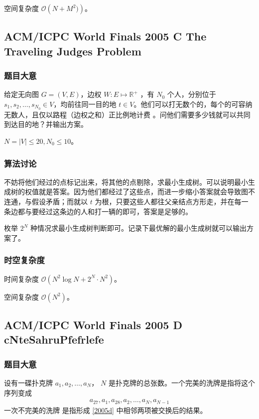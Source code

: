 				空间复杂度 $\mathcal{O}\left(N + M^2)\right)$。
		\newpage
		\subsection{ACM/ICPC World Finals 2005 C The Traveling Judges Problem}
			\subsubsection{题目大意}
				给定无向图 $G=(V, E)$，边权 $W: E \mapsto \mathbb{R}^{+}$ ，有 $N_0$ 个人，分别位于 $s_1, s_2, \ldots, s_{N_0}\in V$，均前往同一目的地 $t \in V$。他们可以打无数个的，每个的可容纳无数人，且仅以路程（边权之和）正比例地计费
				。问他们需要多少钱就可以共同到达目的地？并输出方案。
				
				$N = |V| \le 20, N_0 \le 10
				$。
			\subsubsection{算法讨论}
				不妨将他们经过的点标记出来，将其他的点剔除，求最小生成树。可以说明最小生成树的权值就是答案。因为他们都经过了这些点，而进一步缩小答案就会导致图不连通，与假设矛盾；而就以 $t$ 为根，只要这些人都往父亲结点方形走，并在每一条边都与要经过这条边的人和打一辆的即可，答案是足够的。
				
				枚举 $2^N$ 种情况求最小生成树判断即可。记录下最优解的最小生成树就可以输出方案了。
			\subsubsection{时空复杂度}
				时间复杂度 $\mathcal{O}\left(N^2\log N + 2^N \cdot N^2 \right)$。
					
				空间复杂度 $\mathcal{O}\left(N^2\right)$。
		\newpage
		\subsection{ACM/ICPC World Finals 2005 D cNteSahruPfefrlefe}
			\subsubsection{题目大意}
				设有一碟扑克牌  $a_1, a_2, \ldots, a_N$， $N$ 是扑克牌的总张数。一个完美的洗牌是指将这个序列变成
				\begin{align}
					a_{27},  a_1, a_{28}, a_2, \ldots, a_N, a_{N-1}  \label{2005d}
				\end{align}
				一次不完美的洗牌 
				是指形成 \eqref{2005d} 中相邻两项被交换后的结果。
				
